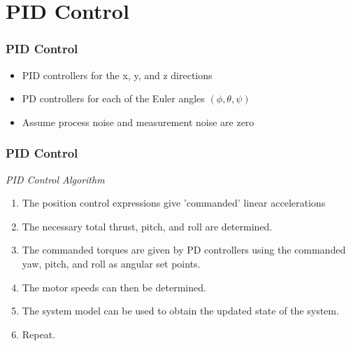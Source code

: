 \documentclass{beamer}
\begin{document}
\section{PID Control}


\begin{frame}
\frametitle{PID Control}


\begin{itemize}
\item PID controllers for the x, y, and z directions

\item PD controllers for each of the Euler angles $(\phi,\theta,\psi)$

\item Assume process noise and measurement noise are zero
\end{itemize}

\end{frame}





\begin{frame}
\frametitle{PID Control}

\textit{PID Control Algorithm}

\begin{enumerate}
\item The position control expressions give 'commanded' linear accelerations
\item The necessary total thrust, pitch, and roll are determined.
\item The commanded torques are given by PD controllers using the commanded yaw, pitch, and roll as angular set points.
\item The motor speeds can then be determined.
\item The system model can be used to obtain the updated state of the system.
\item Repeat.
\end{enumerate}

\end{frame}



\end{document}
